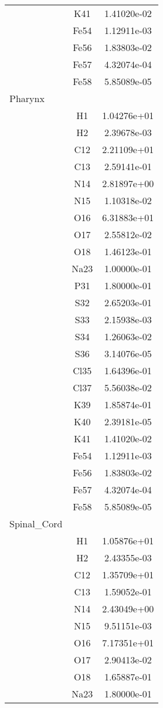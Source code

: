 \begin{centering}
\begin{longtable}{l c c}
& K41 & 1.41020e-02 \\ 
& Fe54 & 1.12911e-03 \\ 
& Fe56 & 1.83803e-02 \\ 
& Fe57 & 4.32074e-04 \\ 
& Fe58 & 5.85089e-05 \\ 
\hline
Pharynx & & \\
\hline
& H1 & 1.04276e+01 \\ 
& H2 & 2.39678e-03 \\ 
& C12 & 2.21109e+01 \\ 
& C13 & 2.59141e-01 \\ 
& N14 & 2.81897e+00 \\ 
& N15 & 1.10318e-02 \\ 
& O16 & 6.31883e+01 \\ 
& O17 & 2.55812e-02 \\ 
& O18 & 1.46123e-01 \\ 
& Na23 & 1.00000e-01 \\ 
& P31 & 1.80000e-01 \\ 
& S32 & 2.65203e-01 \\ 
& S33 & 2.15938e-03 \\ 
& S34 & 1.26063e-02 \\ 
& S36 & 3.14076e-05 \\ 
& Cl35 & 1.64396e-01 \\ 
& Cl37 & 5.56038e-02 \\ 
& K39 & 1.85874e-01 \\ 
& K40 & 2.39181e-05 \\ 
& K41 & 1.41020e-02 \\ 
& Fe54 & 1.12911e-03 \\ 
& Fe56 & 1.83803e-02 \\ 
& Fe57 & 4.32074e-04 \\ 
& Fe58 & 5.85089e-05 \\ 
\hline
Spinal_Cord & & \\
\hline
& H1 & 1.05876e+01 \\ 
& H2 & 2.43355e-03 \\ 
& C12 & 1.35709e+01 \\ 
& C13 & 1.59052e-01 \\ 
& N14 & 2.43049e+00 \\ 
& N15 & 9.51151e-03 \\ 
& O16 & 7.17351e+01 \\ 
& O17 & 2.90413e-02 \\ 
& O18 & 1.65887e-01 \\ 
& Na23 & 1.80000e-01 \\ 

\end{longtable}
\end{centering}
